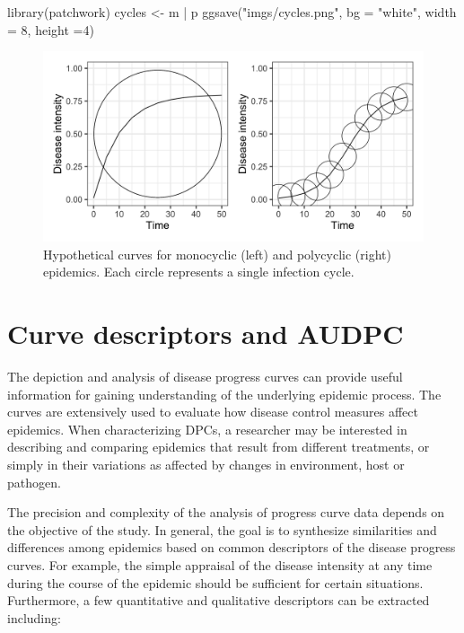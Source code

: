 \documentclass[
  letterpaper,
  DIV=11,
  numbers=noendperiod]{scrreprt}
\newenvironment{Shaded}{\begin{snugshade}}{\end{snugshade}}
\newcommand{\AttributeTok}[1]{\textcolor[rgb]{0.40,0.45,0.13}{#1}}
\newcommand{\DecValTok}[1]{\textcolor[rgb]{0.68,0.00,0.00}{#1}}
\newcommand{\FunctionTok}[1]{\textcolor[rgb]{0.28,0.35,0.67}{#1}}
\newcommand{\NormalTok}[1]{\textcolor[rgb]{0.00,0.23,0.31}{#1}}
\newcommand{\OtherTok}[1]{\textcolor[rgb]{0.00,0.23,0.31}{#1}}
\newcommand{\SpecialCharTok}[1]{\textcolor[rgb]{0.37,0.37,0.37}{#1}}
\newcommand{\StringTok}[1]{\textcolor[rgb]{0.13,0.47,0.30}{#1}}
\begin{document}
\begin{Shaded}
\begin{Highlighting}[]
\FunctionTok{library}\NormalTok{(patchwork)}
\NormalTok{cycles }\OtherTok{\textless{}{-}}\NormalTok{ m }\SpecialCharTok{|}\NormalTok{ p}
\FunctionTok{ggsave}\NormalTok{(}\StringTok{"imgs/cycles.png"}\NormalTok{, }\AttributeTok{bg =} \StringTok{"white"}\NormalTok{, }\AttributeTok{width =} \DecValTok{8}\NormalTok{, }\AttributeTok{height =}\DecValTok{4}\NormalTok{)}
\end{Highlighting}
\end{Shaded}

\begin{figure}

{\centering \includegraphics{imgs/cycles.png}

}

\caption{\label{fig-cycles}Hypothetical curves for monocyclic (left) and
polycyclic (right) epidemics. Each circle represents a single infection
cycle.}

\end{figure}

\hypertarget{curve-descriptors-and-audpc}{%
\section{Curve descriptors and
AUDPC}\label{curve-descriptors-and-audpc}}

The depiction and analysis of disease progress curves can provide useful
information for gaining understanding of the underlying epidemic
process. The curves are extensively used to evaluate how disease control
measures affect epidemics. When characterizing DPCs, a researcher may be
interested in describing and comparing epidemics that result from
different treatments, or simply in their variations as affected by
changes in environment, host or pathogen.

The precision and complexity of the analysis of progress curve data
depends on the objective of the study. In general, the goal is to
synthesize similarities and differences among epidemics based on common
descriptors of the disease progress curves. For example, the simple
appraisal of the disease intensity at any time during the course of the
epidemic should be sufficient for certain situations. Furthermore, a few
quantitative and qualitative descriptors can be extracted including:
\end{document}
